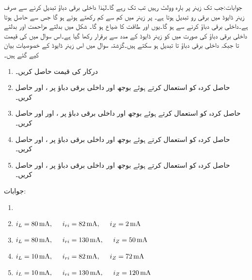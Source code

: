%
جوابات:جب تک زینر پر بارہ وولٹ رہیں تب تک  رہے گا۔لہٰذا داخلی برقی دباؤ تبدیل کرنے سے صرف زینر ڈایوڈ میں برقی رو تبدیل ہوتا ہے۔ پر زینر میں کم سے کم  رکھتے ہوئے  ہو گا جس سے  حاصل ہوتا ہے۔داخلی برقی دباؤ  کرنے سے  ہو گا۔یوں  اور طاقت کا ضیاع  ہو گا۔
شکل   میں بدلتے مزاحمت  اور بدلتے داخلی برقی دباؤ کی صورت میں  کو زینر ڈایوڈ کے مدد سے برقرار رکھا گیا ہے۔اس سوال میں  کی قیمت  تا  جبکہ داخلی برقی دباؤ  تا  تبدیل ہو سکتے ہیں۔گزشتہ سوال میں اس زینر ڈایوڈ کے خصوصیات بیان کیے گئے ہیں۔
\begin{enumerate}
\item
درکار  کی قیمت حاصل کریں۔
\item
حاصل کردہ  کو استعمال کرتے ہوئے  بوجھ اور  داخلی برقی دباؤ پر ،   اور  حاصل کریں۔
\item
حاصل کردہ  کو استعمال کرتے ہوئے  بوجھ اور  داخلی برقی دباؤ پر ،   اور  اور حاصل کریں۔
\item
حاصل کردہ  کو استعمال کرتے ہوئے  بوجھ اور  داخلی برقی دباؤ پر ،   اور   حاصل کریں۔
\item
حاصل کردہ  کو استعمال کرتے ہوئے  بوجھ اور  داخلی برقی دباؤ پر ،  اور  حاصل کریں۔
\end{enumerate}
جوابات:
\begin{enumerate}
\item
{}
\item
$i_L=\SI{80}{\milli \ampere}, \hspace{5mm} i_{ri}=\SI{82}{\milli \ampere }, \hspace{5mm} i_Z=\SI{2}{\milli \ampere}$
\item
$i_L=\SI{80}{\milli \ampere}, \hspace{5mm} i_{ri}=\SI{130}{\milli \ampere }, \hspace{5mm} i_Z=\SI{50}{\milli \ampere}$
\item
$i_L=\SI{10}{\milli \ampere}, \hspace{5mm} i_{ri}=\SI{82}{\milli \ampere }, \hspace{5mm} i_Z=\SI{72}{\milli \ampere}$
\item
$i_L=\SI{10}{\milli \ampere}, \hspace{5mm} i_{ri}=\SI{130}{\milli \ampere }, \hspace{5mm} i_Z=\SI{120}{\milli \ampere}$

\end{enumerate} 
